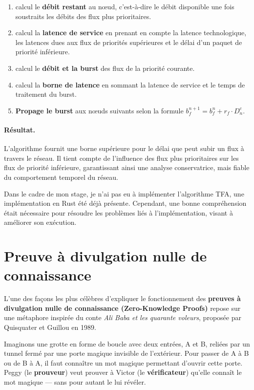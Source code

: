 \documentclass[12pt]{report}
\begin{document}
\begin{enumerate}
  \item calcul le \textbf{débit restant} au nœud, c'est-à-dire le débit disponible une fois soustraits les débits des flux plus prioritaires.
  \item calcul la \textbf{latence de service} en prenant en compte la latence technologique, les latences dues aux flux de priorités supérieures et le délai d'un paquet de priorité inférieure.
  \item calcul le \textbf{débit et la burst} des flux de la priorité courante.
  \item calcul la \textbf{borne de latence} en sommant la latence de service et le temps de traitement du burst.
  \item \textbf{Propage le burst} aux nœuds suivants selon la formule $b_{f}^{n+1} = b_{f}^{n} + r_f \cdot D^c_n$.
\end{enumerate}

\paragraph{Résultat.} L'algorithme fournit une borne supérieure 
pour le délai que peut subir un flux à travers le réseau. 
Il tient compte de l'influence des flux plus prioritaires sur 
les flux de priorité inférieure, garantissant ainsi une analyse 
conservatrice, mais fiable du comportement temporel du réseau.

\vspace{2cm}

Dans le cadre de mon stage, je n'ai pas eu à implémenter l'algorithme TFA,
une implémentation en Rust été déjà présente. Cependant, une bonne compréhension
était nécessaire pour résoudre les problèmes liés à l'implémentation,
visant à améliorer son exécution.

\section*{Preuve à divulgation nulle de connaissance}

L'une des façons les plus célèbres d'expliquer le fonctionnement des \textbf{preuves à divulgation nulle de connaissance (Zero-Knowledge Proofs)} repose sur une métaphore inspirée du conte \textit{Ali Baba et les quarante voleurs}, proposée par Quisquater et Guillou en 1989.

Imaginons une grotte en forme de boucle avec deux entrées, A et B, reliées par un tunnel fermé par une porte magique invisible de l'extérieur. Pour passer de A à B ou de B à A, il faut connaître un mot magique permettant d'ouvrir cette porte. Peggy (le \textbf{prouveur}) veut prouver à Victor (le \textbf{vérificateur}) qu'elle connaît le mot magique — sans pour autant le lui révéler.
\end{document}
